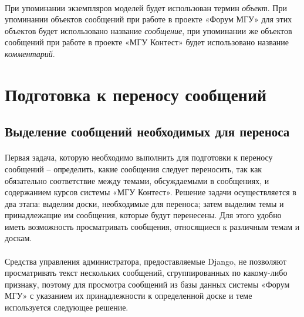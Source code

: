 \documentclass[12pt, a4paper, oneside]{article}
\begin{document}
\paragraph{}
При упоминании экземпляров моделей будет использован термин \textit{объект}. При упоминании объектов сообщений при работе в проекте «Форум МГУ» для этих объектов будет использовано название \textit{сообщение}, при упоминании же объектов сообщений при работе в проекте «МГУ Контест» будет использовано название \textit{комментарий}.
\newpage

\section{Подготовка к переносу сообщений}
\subsection{Выделение сообщений необходимых для переноса}
\paragraph{}
Первая задача, которую необходимо выполнить для подготовки к переносу сообщений – определить, какие сообщения следует переносить, так как обязательно соответствие между темами, обсуждаемыми в сообщениях, и содержанием курсов системы «МГУ Контест». Решение задачи осуществляется в два этапа: выделим доски, необходимые для переноса; затем выделим темы и принадлежащие им сообщения, которые будут перенесены. Для этого удобно иметь возможность просматривать сообщения, относящиеся к различным темам и доскам.
\paragraph{}
Средства управления администратора, предоставляемые Django, не позволяют просматривать текст нескольких сообщений, сгруппированных по какому-либо признаку, поэтому для просмотра сообщений из базы данных системы «Форум МГУ» с указанием их принадлежности к определенной доске и теме используется следующее решение.
\end{document}

